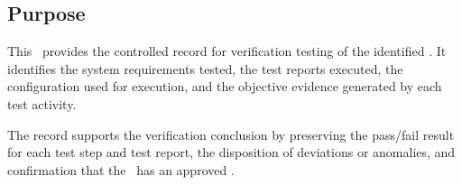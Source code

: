 \subsection{Purpose}
This \stdRptPkg\ provides the controlled record for verification testing of the
identified \stdCfgItem.  It identifies the system requirements tested, the test
reports executed, the configuration used for execution, and the objective
evidence generated by each test activity.

\tlcVspace

The record supports the verification conclusion by preserving the pass/fail
result for each test step and test report, the disposition of deviations or
anomalies, and confirmation that the \stdCfgItem\ has an approved \stdCfgID.
